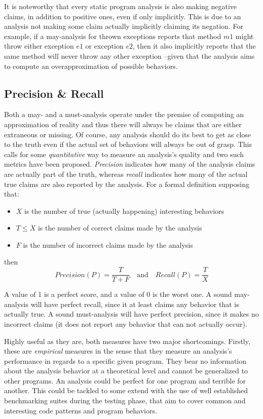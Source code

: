 It is noteworthy that every static program analysis is also making negative claims, in addition to positive ones, even if only implicitly. This is due to an analysis not making some claim actually implicitly claiming its negation. For example, if a may-analysis for thrown exceptions reports that method $m1$ might throw either exception $e1$ or exception $e2$, then it also implicitly reports that the same method will never throw any other exception --given that the analysis aims to compute an overapproximation of possible behaviors.

\subsection{Precision \& Recall}

Both a may- and a must-analysis operate under the premise of computing an approximation of reality and thus there will always be claims that are either extraneous or missing. Of course, any analysis should do its best to get as close to the truth even if the actual set of behaviors will always be out of grasp. This calls for some \emph{quantitative} way to measure an analysis's quality and two such metrics have been proposed. \emph{Precision} indicates how many of the analysis claims are actually part of the truth, whereas \emph{recall} indicates how many of the actual true claims are also reported by the analysis. For a formal definition supposing that:
\begin{itemize}
    \item $X$ is the number of true (actually happening) interesting behaviors
    \item $T \leq X$ is the number of correct claims made by the analysis
    \item $F$ is the number of incorrect claims made by the analysis
\end{itemize}
then
\[
Precision(P) = \frac{T}{T + F}
\quad \textrm{and} \quad
Recall(P) = \frac{T}{X}
\]

A value of 1 is a perfect score, and a value of 0 is the worst one. A sound may-analysis will have perfect recall, since it at least claims any behavior that is actually true. A sound must-analysis will have perfect precision, since it makes no incorrect claims (it does not report any behavior that can not actually occur).

Highly useful as they are, both measures have two major shortcomings. Firstly, these are \emph{empirical} measures in the sense that they measure an analysis's performance in regards to a specific given program. They bear no information about the analysis behavior at a theoretical level and cannot be generalized to other programs. An analysis could be perfect for one program and terrible for another. This could be tackled to some extend with the use of well established benchmarking suites during the testing phase, that aim to cover common and interesting code patterns and program behaviors.


